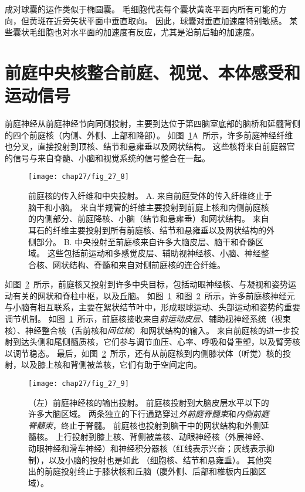 成对球囊的运作类似于椭圆囊。
毛细胞代表每个囊状黄斑平面内所有可能的方向，但黄斑在近旁矢状平面中垂直取向。
因此，球囊对垂直加速度特别敏感。
某些囊状毛细胞也对水平面的加速度有反应，尤其是沿前后轴的加速度。



\section{前庭中央核整合前庭、视觉、本体感受和运动信号}

前庭神经从前庭神经节向同侧投射，主要到达位于第四脑室底部的脑桥和延髓背侧的四个前庭核（内侧、外侧、上部和降部）。
如图~\ref{fig:27_8}A~所示，许多前庭神经纤维也分叉，直接投射到顶核、结节和悬雍垂以及网状结构。
这些核将来自前庭器官的信号与来自脊髓、小脑和视觉系统的信号整合在一起。


\begin{figure}[htbp]
	\centering
	\texttt{[image: chap27/fig\_27\_8]}
	\caption{前庭核的传入纤维和中央投射。
		A. 来自前庭受体的传入纤维终止于脑干和小脑。
		来自半规管的纤维主要投射到前庭上核和内侧前庭核的内侧部分、前庭降核、小脑（结节和悬雍垂）和网状结构。
		来自耳石的纤维主要投射到所有前庭核、结节和悬雍垂以及网状结构的外侧部分\cite{gacek1974localization}。
		B. 中央投射至前庭核来自许多大脑皮层、脑干和脊髓区域。
		这些包括前运动和多感觉皮层、辅助视神经核、小脑、神经整合核、网状结构、脊髓和来自对侧前庭核的连合纤维。}
	\label{fig:27_8}
\end{figure}


如图~\ref{fig:27_9}~所示，前庭核又投射到许多中央目标，包括动眼神经核、与凝视和姿势运动有关的网状和脊柱中枢，以及丘脑。
如图~\ref{fig:27_8}~和图~\ref{fig:27_9}~所示，许多前庭核神经元与小脑有相互联系，主要在絮状结节叶中，形成眼球运动、头部运动和姿势的重要调节机制。
如图~\ref{fig:27_8}~所示，前庭核接收来自\textit{前运动皮层}、辅助视神经系统（视束核）、神经整合核（舌前核和\textit{间位核}）和网状结构的输入。
来自前庭核的进一步投射到达头侧和尾侧髓质核，它们参与调节血压、心率、呼吸和骨重塑，以及臂旁核以调节稳态。
最后，如图~\ref{fig:27_9}~所示，还有从前庭核到内侧膝状体（听觉）核的投射，以及膝上核和背侧被盖核，它们有助于空间定向。


\begin{figure}[htbp]
	\centering
	\texttt{[image: chap27/fig\_27\_9]}
	\caption{（左）前庭神经核的输出投射。
		前庭核投射到大脑皮层水平以下的许多大脑区域。
		两条独立的下行通路穿过\textit{外前庭脊髓束}和\textit{内侧前庭脊髓束}，终止于脊髓。
		前庭核也投射到脑干中的网状结构和外侧延髓核。
		上行投射到膝上核、背侧被盖核、动眼神经核（外展神经、动眼神经和滑车神经）和神经积分器核（红线表示兴奋；灰线表示抑制），以及小脑的投射也是如此 （细胞核、结节和悬雍垂）。
		其他突出的前庭投射终止于膝状核和丘脑（腹外侧、后部和椎板内丘脑区域）。}
	\label{fig:27_9}
\end{figure}


